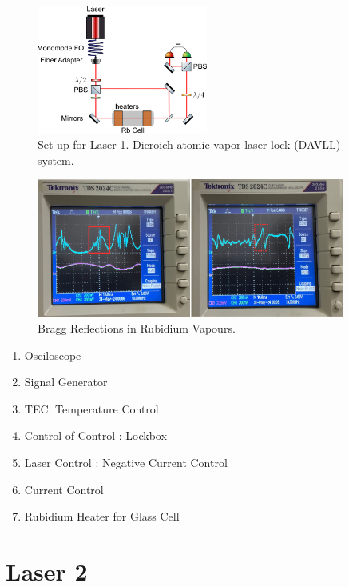 \documentclass[10pt]{article}
\begin{document}
\begin{figure}[h]
    \centering
    \includegraphics[width=0.5\textwidth]{img/rect5909.png}
    \caption{Set up for Laser 1. Dicroich atomic vapor laser lock (DAVLL) system.}
    \label{fig:laser1}
\end{figure}

\begin{figure}[h]
    \centering
    \includegraphics[width=0.9\textwidth]{img/image1.png}
    \caption{Bragg Reflections in Rubidium Vapours.}
    \label{fig:braggref}
\end{figure}


\begin{enumerate}
    \item Osciloscope
    \item Signal Generator
    \item TEC: Temperature Control
    \item Control of Control : Lockbox
    \item Laser Control : Negative Current Control
    \item Current Control %
    \item Rubidium Heater for Glass Cell
\end{enumerate}

\section*{Laser 2}
\end{document}
